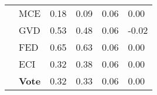 \begin{tabularx}{\linewidth}{*{6}{X}}
 & MCE & {\cellcolor[HTML]{FCB499}} \color[HTML]{000000} 0.18 & {\cellcolor[HTML]{9CC9E1}} \color[HTML]{000000} 0.09  & {\cellcolor[HTML]{FEE6DA}} \color[HTML]{000000} 0.06 & {\cellcolor[HTML]{BED8EC}} \color[HTML]{000000} 0.00 \\
 & GVD & {\cellcolor[HTML]{B61319}} \color[HTML]{F1F1F1} 0.53 & {\cellcolor[HTML]{125DA6}} \color[HTML]{F1F1F1} 0.48  & {\cellcolor[HTML]{FEE6DA}} \color[HTML]{000000} 0.06 & {\cellcolor[HTML]{C6DBEF}} \color[HTML]{000000} -0.02 \\
 & FED & {\cellcolor[HTML]{67000D}} \color[HTML]{F1F1F1} 0.65 & {\cellcolor[HTML]{08306B}} \color[HTML]{F1F1F1} 0.63  & {\cellcolor[HTML]{FEE6DA}} \color[HTML]{000000} 0.06 & {\cellcolor[HTML]{BED8EC}} \color[HTML]{000000} 0.00 \\
 & ECI & {\cellcolor[HTML]{FB694A}} \color[HTML]{F1F1F1} 0.32 & {\cellcolor[HTML]{2B7BBA}} \color[HTML]{F1F1F1} 0.38  & {\cellcolor[HTML]{FEE6DA}} \color[HTML]{000000} 0.06 & {\cellcolor[HTML]{BED8EC}} \color[HTML]{000000} 0.00 \\
 & \textbf{Vote} & {\cellcolor[HTML]{FB694A}} \color[HTML]{F1F1F1} 0.32 & {\cellcolor[HTML]{3888C1}} \color[HTML]{F1F1F1} 0.33  & {\cellcolor[HTML]{FEE6DA}} \color[HTML]{000000} 0.06 & {\cellcolor[HTML]{BED8EC}} \color[HTML]{000000} 0.00 \\
\bottomrule
\end{tabularx}
